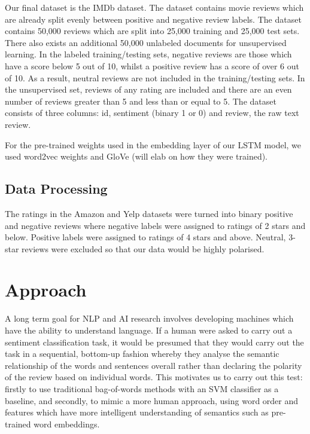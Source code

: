 \documentclass[conference]{IEEEtran}
\begin{document}
Our final dataset is the IMDb dataset. The dataset contains movie reviews which are already split evenly between positive and negative review labels. The dataset contains 50,000 reviews which are split into 25,000 training and 25,000 test sets. There also exists an additional 50,000 unlabeled documents for unsupervised learning. In the labeled training/testing sets, negative reviews are those which have a score below 5 out of 10, whilst a positive review has a score of over 6 out of 10. As a result, neutral reviews are not included in the training/testing sets. In the unsupervised set, reviews of any rating are included and there are an even number of reviews greater than 5 and less than or equal to 5. The dataset consists of three columns: id, sentiment (binary 1 or 0) and review, the raw text review.  

For the pre-trained weights used in the embedding layer of our LSTM model, we used word2vec weights and GloVe (will elab on how they were trained). 

\subsection{Data Processing}

The ratings in the Amazon and Yelp datasets were turned into binary positive and negative reviews where negative labels were assigned to ratings of 2 stars and below. Positive labels were assigned to ratings of 4 stars and above. Neutral, 3-star reviews were excluded so that our data would be highly polarised.

\section{Approach}

A long term goal for NLP and AI research involves developing machines which have the ability to understand language. If a human were asked to carry out a sentiment classification task, it would be presumed that they would carry out the task in a sequential, bottom-up fashion whereby they analyse the semantic relationship of the words and sentences overall rather than declaring the polarity of the review based on individual words. This motivates us to carry out this test: firstly to use traditional bag-of-words methods with an SVM classifier as a baseline, and secondly, to mimic a more human approach, using word order and features which have more intelligent understanding of semantics such as pre-trained word embeddings. 
\end{document}
